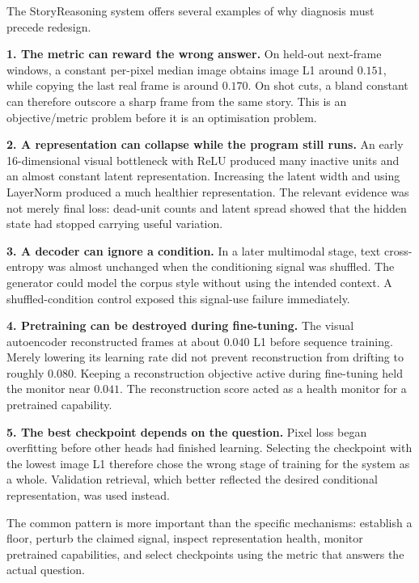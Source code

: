 \begin{architecturebox}[title={Application to the architecture --- a diagnostic cascade}]
The StoryReasoning system offers several examples of why diagnosis must precede redesign.

\textbf{1. The metric can reward the wrong answer.} On held-out next-frame windows, a constant per-pixel median image obtains image L1 around \(0.151\), while copying the last real frame is around \(0.170\). On shot cuts, a bland constant can therefore outscore a sharp frame from the same story. This is an objective/metric problem before it is an optimisation problem.

\textbf{2. A representation can collapse while the program still runs.} An early 16-dimensional visual bottleneck with ReLU produced many inactive units and an almost constant latent representation. Increasing the latent width and using LayerNorm produced a much healthier representation. The relevant evidence was not merely final loss: dead-unit counts and latent spread showed that the hidden state had stopped carrying useful variation.

\textbf{3. A decoder can ignore a condition.} In a later multimodal stage, text cross-entropy was almost unchanged when the conditioning signal was shuffled. The generator could model the corpus style without using the intended context. A shuffled-condition control exposed this signal-use failure immediately.

\textbf{4. Pretraining can be destroyed during fine-tuning.} The visual autoencoder reconstructed frames at about \(0.040\) L1 before sequence training. Merely lowering its learning rate did not prevent reconstruction from drifting to roughly \(0.080\). Keeping a reconstruction objective active during fine-tuning held the monitor near \(0.041\). The reconstruction score acted as a health monitor for a pretrained capability.

\textbf{5. The best checkpoint depends on the question.} Pixel loss began overfitting before other heads had finished learning. Selecting the checkpoint with the lowest image L1 therefore chose the wrong stage of training for the system as a whole. Validation retrieval, which better reflected the desired conditional representation, was used instead.

The common pattern is more important than the specific mechanisms: establish a floor, perturb the claimed signal, inspect representation health, monitor pretrained capabilities, and select checkpoints using the metric that answers the actual question.
\end{architecturebox}

